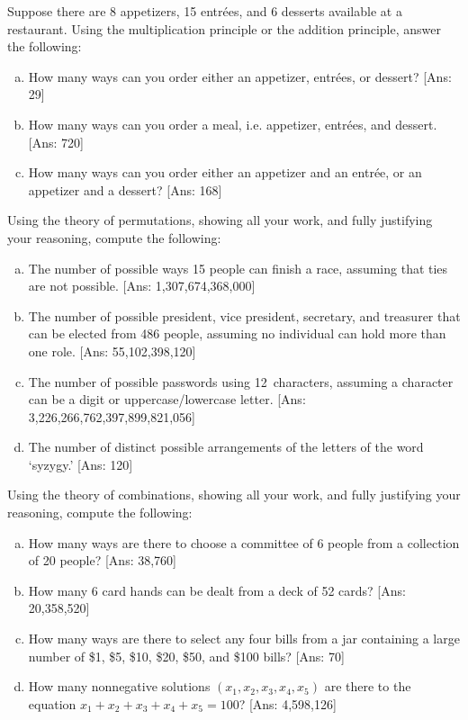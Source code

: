\documentclass[11pt,letterpaper]{article}
\begin{document}

 Suppose there are 8 appetizers, 15 entr\'ees, and 6 desserts available at a restaurant. Using the multiplication principle or the addition principle, answer the following: 
	\begin{enumerate}[(a)]
	\item How many ways can you order either an appetizer, entr\'ees, or dessert? [Ans: 29]
	\item How many ways can you order a meal, i.e. appetizer, entr\'ees, and dessert. [Ans: 720]
	\item How many ways can you order either an appetizer and an entr\'ee, or an appetizer and a dessert? [Ans: 168]
	\end{enumerate}



\newpage



 Using the theory of permutations, showing all your work, and fully justifying your reasoning, compute the following:
	\begin{enumerate}[(a)]
	\item The number of possible ways 15 people can finish a race, assuming that ties are not possible. [Ans: 1,307,674,368,000]
	\item The number of possible president, vice president, secretary, and treasurer that can be elected from 486 people, assuming no individual can hold more than one role. [Ans: 55,102,398,120]
	\item The number of possible passwords using 12~characters, assuming a character can be a digit or uppercase/lowercase letter. [Ans: 3,226,266,762,397,899,821,056]
	\item The number of distinct possible arrangements of the letters of the word `syzygy.' [Ans: 120]
	\end{enumerate}



\newpage



 Using the theory of combinations, showing all your work, and fully justifying your reasoning, compute the following:	
	\begin{enumerate}[(a)]
	\item How many ways are there to choose a committee of 6 people from a collection of 20 people? [Ans: 38,760]
	\item How many 6 card hands can be dealt from a deck of 52 cards? [Ans: 20,358,520]
	\item How many ways are there to select any four bills from a jar containing a large number of \$1, \$5, \$10, \$20, \$50, and \$100 bills? [Ans: 70]
	\item How many nonnegative solutions $(x_1, x_2, x_3, x_4, x_5)$ are there to the equation $x_1 + x_2 + x_3 + x_4 + x_5= 100$? [Ans: 4,598,126]
	\end{enumerate}
\end{document}
